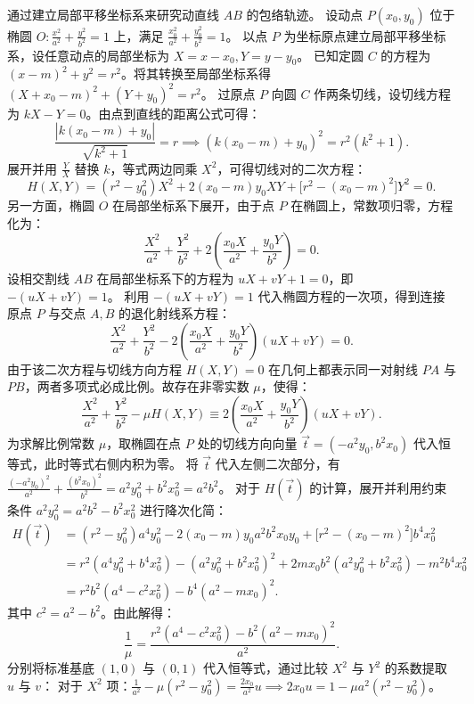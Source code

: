 \begin{solution}
通过建立局部平移坐标系来研究动直线 $AB$ 的包络轨迹。
设动点 $P(x_0, y_0)$ 位于椭圆 $O: \frac{x^2}{a^2} + \frac{y^2}{b^2} = 1$ 上，满足 $\frac{x_0^2}{a^2} + \frac{y_0^2}{b^2} = 1$。
以点 $P$ 为坐标原点建立局部平移坐标系，设任意动点的局部坐标为 $X = x-x_0, Y = y-y_0$。
已知定圆 $C$ 的方程为 $(x-m)^2 + y^2 = r^2$。将其转换至局部坐标系得 $(X+x_0-m)^2 + (Y+y_0)^2 = r^2$。
过原点 $P$ 向圆 $C$ 作两条切线，设切线方程为 $kX - Y = 0$。由点到直线的距离公式可得：
\[ \frac{|k(x_0 - m) + y_0|}{\sqrt{k^2 + 1}} = r \implies (k(x_0 - m) + y_0)^2 = r^2(k^2 + 1). \]
展开并用 $\frac{Y}{X}$ 替换 $k$，等式两边同乘 $X^2$，可得切线对的二次方程：
\[ H(X,Y) = (r^2 - y_0^2)X^2 + 2(x_0 - m)y_0 XY + \big[r^2 - (x_0 - m)^2\big]Y^2 = 0. \]
另一方面，椭圆 $O$ 在局部坐标系下展开，由于点 $P$ 在椭圆上，常数项归零，方程化为：
\[ \frac{X^2}{a^2} + \frac{Y^2}{b^2} + 2\left(\frac{x_0 X}{a^2} + \frac{y_0 Y}{b^2}\right) = 0. \]
设相交割线 $AB$ 在局部坐标系下的方程为 $uX + vY + 1 = 0$，即 $-(uX + vY) = 1$。
利用 $-(uX + vY) = 1$ 代入椭圆方程的一次项，得到连接原点 $P$ 与交点 $A, B$ 的退化射线系方程：
\[ \frac{X^2}{a^2} + \frac{Y^2}{b^2} - 2\left(\frac{x_0 X}{a^2} + \frac{y_0 Y}{b^2}\right)(uX + vY) = 0. \]
由于该二次方程与切线方向方程 $H(X,Y) = 0$ 在几何上都表示同一对射线 $PA$ 与 $PB$，两者多项式必成比例。故存在非零实数 $\mu$，使得：
\[ \frac{X^2}{a^2} + \frac{Y^2}{b^2} - \mu H(X,Y) \equiv 2\left(\frac{x_0 X}{a^2} + \frac{y_0 Y}{b^2}\right)(uX + vY). \]
为求解比例常数 $\mu$，取椭圆在点 $P$ 处的切线方向向量 $\vec{t} = (-a^2 y_0, b^2 x_0)$ 代入恒等式，此时等式右侧内积为零。
将 $\vec{t}$ 代入左侧二次部分，有 $\frac{(-a^2 y_0)^2}{a^2} + \frac{(b^2 x_0)^2}{b^2} = a^2 y_0^2 + b^2 x_0^2 = a^2 b^2$。
对于 $H(\vec{t})$ 的计算，展开并利用约束条件 $a^2 y_0^2 = a^2 b^2 - b^2 x_0^2$ 进行降次化简：
\begin{align*}
H(\vec{t}) &= (r^2 - y_0^2)a^4 y_0^2 - 2(x_0 - m)y_0 a^2 b^2 x_0 y_0 + \big[r^2 - (x_0 - m)^2\big]b^4 x_0^2 \\
&= r^2(a^4 y_0^2 + b^4 x_0^2) - (a^2 y_0^2 + b^2 x_0^2)^2 + 2m x_0 b^2(a^2 y_0^2 + b^2 x_0^2) - m^2 b^4 x_0^2 \\
&= r^2 b^2(a^4 - c^2 x_0^2) - b^4(a^2 - m x_0)^2.
\end{align*}
其中 $c^2 = a^2 - b^2$。由此解得：
\[ \frac{1}{\mu} = \frac{r^2(a^4 - c^2 x_0^2) - b^2(a^2 - m x_0)^2}{a^2}. \]
分别将标准基底 $(1,0)$ 与 $(0,1)$ 代入恒等式，通过比较 $X^2$ 与 $Y^2$ 的系数提取 $u$ 与 $v$：
对于 $X^2$ 项：$\frac{1}{a^2} - \mu(r^2 - y_0^2) = \frac{2x_0}{a^2} u \implies 2x_0 u = 1 - \mu a^2(r^2 - y_0^2)$。

\end{solution}
